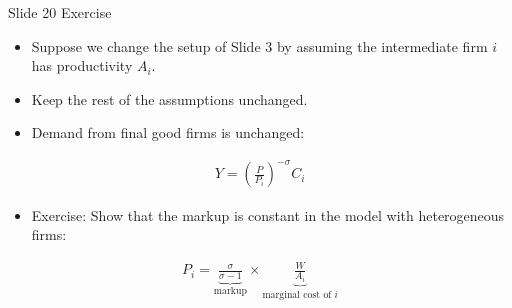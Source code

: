 Slide 20 Exercise

\begin{itemize}
    \item Suppose we change the setup of Slide 3 by assuming the intermediate firm $i$ has productivity $A_i$.
    \item Keep the rest of the assumptions unchanged.
    \item Demand from final good firms is unchanged:
\end{itemize}

\begin{align}
    Y = \left(\frac{P}{P_i}\right)^{-\sigma}C_i
\end{align}

\begin{itemize}
    \item Exercise: Show that the markup is constant in the model with heterogeneous firms:
\end{itemize}

\begin{align}
    P_i = \underbrace{\frac{\sigma}{\sigma-1}}_{\text{markup}} \times \underbrace{\frac{W}{A_i}}_{\text{marginal cost of } i}
\end{align}